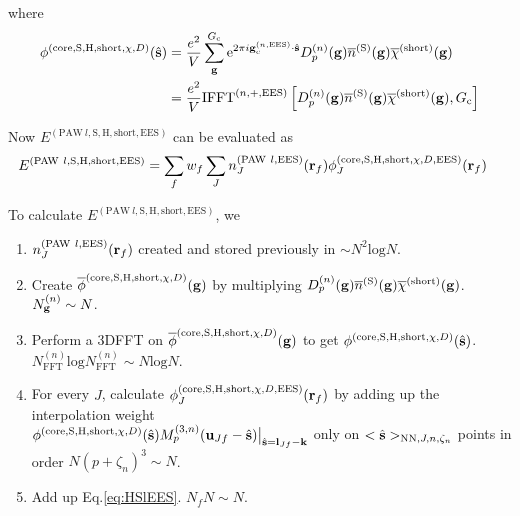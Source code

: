 \documentclass[paper=a4, fontsize=11pt]{article} %
\numberwithin{equation}{section} %
\numberwithin{figure}{section} %
\numberwithin{table}{section} %
\newcommand{\ol}{\overline}
\newcommand{\bu}{{\bf{u}}}
\newcommand{\bl}{{\bf{l}}}
\newcommand{\bk}{{\bf{k}}}
\newcommand{\bs}{{\bf{s}}}
\newcommand{\bg}{{\bf{g}}}
\newcommand{\br}{{\bf{r}}}
\newcommand{\hs}{{\hat{\bf{s}}}}
\newcommand{\rS}{{\mathrm{S}}}
\newcommand{\rEES}{{\mathrm{EES}}}
\newcommand{\rcore}{{\mathrm{core}}}
\newcommand{\rNN}{{\mathrm{NN}}}
\newcommand{\re}{{\mathrm{e}}}
\newcommand{\rshort}{{\mathrm{short}}}
\newcommand{\rP}{{\mathrm{PAW}}}
\newcommand{\rH}{{\mathrm{H}}}
\newcommand{\rl}{{\mathrm{log}}}
\newcommand{\gcnEES}{{\bg_c^{(n,\rEES)}}}
\newcommand{\NFFTn}{{N^{(n)}_{\mathrm{FFT}}}}
\newcommand{\Ngn}{{N^{(n)}_\bg}}
\newcommand{\Gc}{{G_{\mathrm{c}}}}
\newcommand{\Dng}{{D^{(n)}_p(\bg)}}
\newcommand{\Mn}{{M_p^{(3,n)}}}
\newcommand{\IFFTnEES}{{\mathrm{IFFT}^{(n,+,\rEES)}}}
\newcommand{\pzn}{{(p+\zeta_n)^3}}
\newcommand{\hsJn}{{<\hs>_{\rNN,J,n,\zeta_n}}}
\begin{document}
where
\begin{equation}
\begin{split}
\phi^{(\rcore,\rS,\rH,\rshort,\chi,D)}(\hs) &= \frac{e^2}{V}\sum_\bg^\Gc \re^{2\pi i\gcnEES \cdot \hat\bs}  \Dng \ol n^{(\rS)}(\bg)\ol \chi^{(\rshort)}(\bg)\\
&=\frac{e^2}{V} \IFFTnEES\left[\Dng \ol n^{(\rS)}(\bg)\ol \chi^{(\rshort)}(\bg),\Gc\right]
\end{split}
\end{equation}


Now $E^{(\rP\ l,\rS,\rH,\rshort,\rEES)}$ can be evaluated as
\begin{equation}\label{eq:HSlEES}
\begin{split}
E^{(\rP\ l,\rS,\rH,\rshort,\rEES)}
&= \sum_f w_f \sum_J n_J^{(\rP\ l,\rEES)}(\br_f) \phi_J^{(\rcore,\rS,\rH,\rshort,\chi,D,\rEES)}(\br_f)
\end{split}
\end{equation}

To calculate $E^{(\rP\ l,\rS,\rH,\rshort,\rEES)}$, we
\begin{enumerate}
\item $ n_J^{(\rP\ l,\rEES)}(\br_f)$ created and stored previously in $\sim N^2 \rl N$.
\item Create $\ol \phi^{(\rcore,\rS,\rH,\rshort,\chi,D)}(\bg)$ by multiplying $\Dng \ol n^{(\rS)}(\bg)\ol \chi^{(\rshort)}(\bg)$. $\Ngn \sim N$.
\item Perform a 3DFFT on $\ol \phi^{(\rcore,\rS,\rH,\rshort,\chi,D)}(\bg)$ to get $\phi^{(\rcore,\rS,\rH,\rshort,\chi,D)}(\hs)$. $\NFFTn \rl \NFFTn \sim N \rl N$.
\item For every $J$, calculate $\phi_J^{(\rcore,\rS,\rH,\rshort,\chi,D,\rEES)}(\br_f)$ by adding up the interpolation weight \\
$\phi^{(\rcore,\rS,\rH,\rshort,\chi,D)}(\hs)\Mn(\bu_{Jf}-\hat \bs)\big|_{\hs=\bl_{Jf}-\bk}$ only on $\hsJn$ points in order $N \pzn \sim N$.
\item Add up Eq.\eqref{eq:HSlEES}. $N_f N \sim N$.\\
\end{enumerate}
\end{document}
